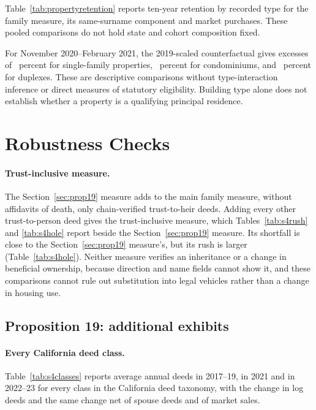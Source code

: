 Table~\ref{tab:propertyretention} reports ten-year retention by recorded type for the family measure, its same-surname component and market purchases. These pooled comparisons do not hold state and cohort composition fixed.

For November 2020--February 2021, the 2019-scaled counterfactual gives excesses of \TypeAnticSF\ percent for single-family properties, \TypeAnticCondo\ percent for condominiums, and \TypeAnticDuplex\ percent for duplexes. These are descriptive comparisons without type-interaction inference or direct measures of statutory eligibility. Building type alone does not establish whether a property is a qualifying principal residence.

\section{Robustness Checks}\label{app:robustness}

\paragraph{Trust-inclusive measure.} The Section~\ref{sec:prop19} measure adds to the main family measure, without affidavits of death, only chain-verified trust-to-heir deeds. Adding every other trust-to-person deed gives the trust-inclusive measure, which Tables~\ref{tab:s4rush} and \ref{tab:s4hole} report beside the Section~\ref{sec:prop19} measure. Its shortfall is close to the Section~\ref{sec:prop19} measure's, but its rush is larger (Table~\ref{tab:s4hole}). Neither measure verifies an inheritance or a change in beneficial ownership, because direction and name fields cannot show it, and these comparisons cannot rule out substitution into legal vehicles rather than a change in housing use.







\subsection{Proposition 19: additional exhibits}\label{app:s4}

\paragraph{Every California deed class.} Table~\ref{tab:s4classes} reports average annual deeds in 2017--19, in 2021 and in 2022--23 for every class in the California deed taxonomy, with the change in log deeds and the same change net of spouse deeds and of market sales.

